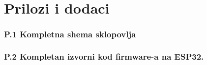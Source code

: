 \section*{Prilozi i dodaci}

\subsubsection*{P.1 Kompletna shema sklopovlja}



\subsubsection*{P.2 Kompletan izvorni kod firmware-a na ESP32.}

\begin{code}
    \inputminted[breaklines]{C}{kod/main.c}
\end{code}

\begin{code}
    \inputminted[breaklines]{C}{kod/common.c}
\end{code}

\begin{code}
    \inputminted[breaklines]{C}{kod/init.c}
\end{code}

\begin{code}
    \inputminted[breaklines]{C}{kod/psa_helper.c}
\end{code}

\begin{code}
    \inputminted[breaklines]{C}{kod/tss_task.c}
\end{code}

\begin{code}
    \inputminted[breaklines]{C}{kod/tss463c.c}
\end{code}

\begin{code}
    \inputminted[breaklines]{C}{kod/uart_task.c}
\end{code}

\begin{code}
    \inputminted[breaklines]{C}{kod/van_packet_parser.c}
\end{code}

